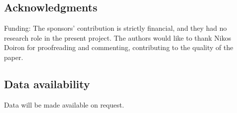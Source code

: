 \documentclass[final,5p,times,twocolumn]{elsarticle}
\theoremstyle{definition}
\begin{document}
\subsection{Acknowledgments}
Funding: The sponsors' contribution is strictly financial, and they had no research role in the present project.
The authors would like to thank Nikos Doiron for proofreading and commenting, contributing to the quality of the paper.

\subsection{Data availability}
Data will be made available on request.




\end{document}
